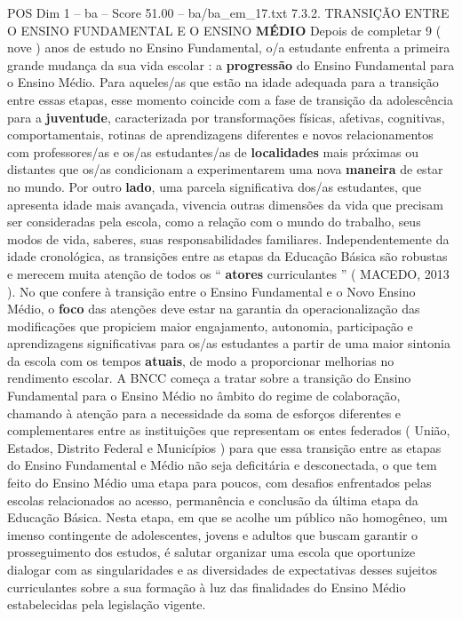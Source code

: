 \begin{textsample}{POS Dim 1 – ba – Score 51.00 – ba/ba\_em\_17.txt}  \label{ex:f1_pos_108}
7.3.2.
TRANSIÇÃO ENTRE O ENSINO FUNDAMENTAL E O ENSINO \textbf{MÉDIO} Depois de completar 9 ( nove ) anos de estudo no Ensino Fundamental, o/a estudante enfrenta a primeira grande mudança da sua vida escolar : a \textbf{progressão} do Ensino Fundamental para o Ensino Médio.
Para aqueles/as que estão na idade adequada para a transição entre essas etapas, esse momento coincide com a fase de transição da adolescência para a \textbf{juventude}, caracterizada por transformações físicas, afetivas, cognitivas, comportamentais, rotinas de aprendizagens diferentes e novos relacionamentos com professores/as e os/as estudantes/as de \textbf{localidades} mais próximas ou distantes que os/as condicionam a experimentarem uma nova \textbf{maneira} de estar no mundo.
Por outro \textbf{lado}, uma parcela significativa dos/as estudantes, que apresenta idade mais avançada, vivencia outras dimensões da vida que precisam ser consideradas pela escola, como a relação com o mundo do trabalho, seus modos de vida, saberes, suas responsabilidades familiares.
Independentemente da idade cronológica, as transições entre as etapas da Educação Básica são robustas e merecem muita atenção de todos os “ \textbf{atores} curriculantes ” ( MACEDO, 2013 ).
No que confere à transição entre o Ensino Fundamental e o Novo Ensino Médio, o \textbf{foco} das atenções deve estar na garantia da operacionalização das modificações que propiciem maior engajamento, autonomia, participação e aprendizagens significativas para os/as estudantes a partir de uma maior sintonia da escola com os tempos \textbf{atuais}, de modo a proporcionar melhorias no rendimento escolar.
A BNCC começa a tratar sobre a transição do Ensino Fundamental para o Ensino Médio no âmbito do regime de colaboração, chamando à atenção para a necessidade da soma de esforços diferentes e complementares entre as instituições que representam os entes federados ( União, Estados, Distrito Federal e Municípios ) para que essa transição entre as etapas do Ensino Fundamental e Médio não seja deficitária e desconectada, o que tem feito do Ensino Médio uma etapa para poucos, com desafios enfrentados pelas escolas relacionados ao acesso, permanência e conclusão da última etapa da Educação Básica.
Nesta etapa, em que se acolhe um público não homogêneo, um imenso contingente de adolescentes, jovens e adultos que buscam garantir o prosseguimento dos estudos, é salutar organizar uma escola que oportunize dialogar com as singularidades e as diversidades de expectativas desses sujeitos curriculantes sobre a sua formação à luz das finalidades do Ensino Médio estabelecidas pela legislação vigente.

\end{textsample}
